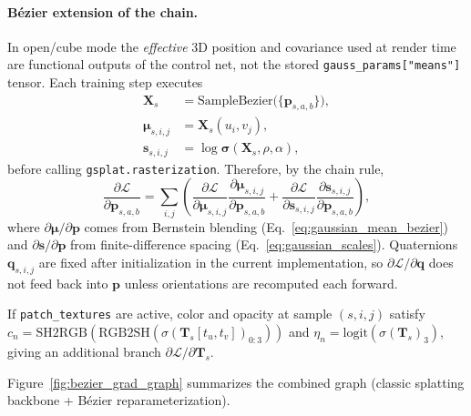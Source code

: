 \documentclass{report}
\newcommand{\code}[1]{\nolinkurl{#1}}
\begin{document}
\paragraph{B\'ezier extension of the chain.}
In open/cube mode the \emph{effective} 3D position and covariance used at render time are functional outputs of the control net, not the stored \code{gauss\_params["means"]} tensor. Each training step executes
\begin{align}
\mathbf{X}_s &= \mathrm{SampleBezier}\bigl(\{\mathbf{p}_{s,a,b}\}\bigr), \\
\boldsymbol{\mu}_{s,i,j} &= \mathbf{X}_s(u_i,v_j), \\
\mathbf{s}_{s,i,j} &= \log\boldsymbol{\sigma}(\mathbf{X}_s,\rho,\alpha),
\label{eq:reparam_chain}
\end{align}
before calling \code{gsplat.rasterization}. Therefore, by the chain rule,
\begin{equation}
\frac{\partial\mathcal{L}}{\partial \mathbf{p}_{s,a,b}}
=
\sum_{i,j}
\left(
\frac{\partial\mathcal{L}}{\partial\boldsymbol{\mu}_{s,i,j}}
\frac{\partial\boldsymbol{\mu}_{s,i,j}}{\partial \mathbf{p}_{s,a,b}}
+
\frac{\partial\mathcal{L}}{\partial\mathbf{s}_{s,i,j}}
\frac{\partial\mathbf{s}_{s,i,j}}{\partial \mathbf{p}_{s,a,b}}
\right),
\label{eq:grad_cp_chain}
\end{equation}
where $\partial\boldsymbol{\mu}/\partial\mathbf{p}$ comes from Bernstein blending (Eq.~\eqref{eq:gaussian_mean_bezier}) and $\partial\mathbf{s}/\partial\mathbf{p}$ from finite-difference spacing (Eq.~\eqref{eq:gaussian_scales}). Quaternions $\mathbf{q}_{s,i,j}$ are fixed after initialization in the current implementation, so $\partial\mathcal{L}/\partial\mathbf{q}$ does not feed back into $\mathbf{p}$ unless orientations are recomputed each forward.

If \texttt{patch\_textures} are active, color and opacity at sample $(s,i,j)$ satisfy
$c_n=\mathrm{SH2RGB}(\mathrm{RGB2SH}(\sigma(\mathbf{T}_s[t_u,t_v])_{0:3}))$ and $\eta_n=\mathrm{logit}(\sigma(\mathbf{T}_s)_{3})$, giving an additional branch $\partial\mathcal{L}/\partial\mathbf{T}_s$.

Figure~\ref{fig:bezier_grad_graph} summarizes the combined graph (classic splatting backbone + B\'ezier reparameterization).
\end{document}
